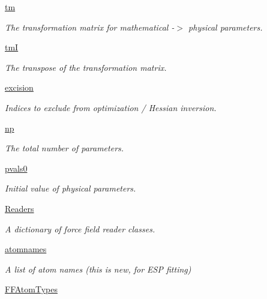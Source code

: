 \begin{DoxyCompactItemize}
\hyperlink{classforcebalance_1_1forcefield_1_1FF_aaf4763b05f3c1f7762d5c4d656ad106a}{tm}
\begin{DoxyCompactList}\small\item\em The transformation matrix for mathematical -\/$>$ physical parameters. \end{DoxyCompactList}\item 
\hyperlink{classforcebalance_1_1forcefield_1_1FF_a3a288d2514106e171af1d0e31311f97a}{tm\-I}
\begin{DoxyCompactList}\small\item\em The transpose of the transformation matrix. \end{DoxyCompactList}\item 
\hyperlink{classforcebalance_1_1forcefield_1_1FF_ad573c583207080fa66592bcbf788cbad}{excision}
\begin{DoxyCompactList}\small\item\em Indices to exclude from optimization / Hessian inversion. \end{DoxyCompactList}\item 
\hyperlink{classforcebalance_1_1forcefield_1_1FF_a19eb80acc94a49f9ff806f13a95fef66}{np}
\begin{DoxyCompactList}\small\item\em The total number of parameters. \end{DoxyCompactList}\item 
\hyperlink{classforcebalance_1_1forcefield_1_1FF_acfa4068ac91d195f89e65d6d725bb082}{pvals0}
\begin{DoxyCompactList}\small\item\em Initial value of physical parameters. \end{DoxyCompactList}\item 
\hyperlink{classforcebalance_1_1forcefield_1_1FF_a9db381836dba8b531ff7d45dce877f4f}{Readers}
\begin{DoxyCompactList}\small\item\em A dictionary of force field reader classes. \end{DoxyCompactList}\item 
\hyperlink{classforcebalance_1_1forcefield_1_1FF_ae18c15606b40f8c417cbfd6129554793}{atomnames}
\begin{DoxyCompactList}\small\item\em A list of atom names (this is new, for E\-S\-P fitting) \end{DoxyCompactList}\item 
\hyperlink{classforcebalance_1_1forcefield_1_1FF_a38e238188fdd105477cd3ad38ca3753b}{F\-F\-Atom\-Types}

\end{DoxyCompactItemize}
